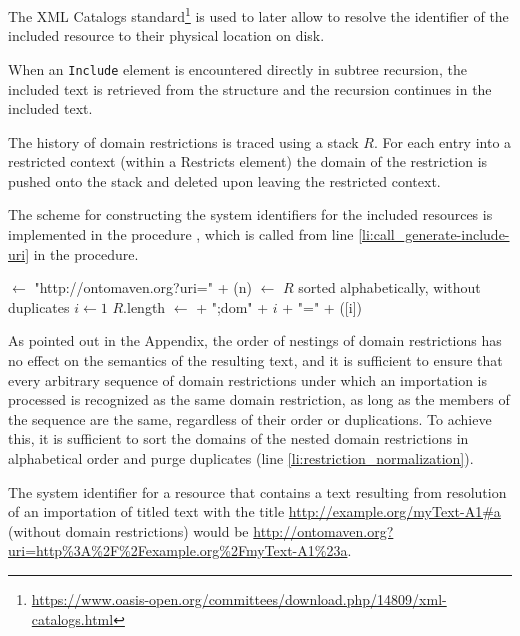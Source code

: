 \documentclass{IOS-Book-Article}
\begin{document}
The XML Catalogs standard\footnote{\url{https://www.oasis-open.org/committees/download.php/14809/xml-catalogs.html}} is used to later allow to resolve the identifier of the included resource to their physical location on disk. 

When an \texttt{Include} element is encountered directly in subtree recursion, the included text is retrieved from the  structure and the recursion continues in the included text.

The history of domain restrictions is traced using a stack $R$. For each entry into a restricted context (within a Restricts element) the domain of the restriction is pushed onto the stack and deleted upon leaving the restricted context.

The scheme for constructing the system identifiers for the included resources is implemented in the procedure , which is called from line \ref{li:call_generate-include-uri} in the  procedure.

\begin{codebox}
\zi {}
\li {} $\gets$ "http://ontomaven.org?uri=" + (n)
\li {} $\gets$ $R$ sorted alphabetically, without duplicates \label{li:restriction_normalization}
\li \For $i \gets 1$ \To $R$.length
\li \Do
\li     {} $\gets$  + ";dom" + $i$ + "=" + ([i])
\End
\li \Return {}
\end{codebox}

As pointed out in the Appendix, the order of nestings of domain restrictions  has no effect on the semantics of the resulting text, and it is sufficient to ensure that every arbitrary sequence of domain restrictions under which an importation is processed is recognized as the same domain restriction, as long as the members of the sequence are the same, regardless of their order or duplications. To achieve this, it is sufficient to sort the domains of the nested domain restrictions in alphabetical order and purge duplicates (line \ref{li:restriction_normalization}).

The system identifier for a resource that contains a text resulting from resolution of an importation of titled text with the title \url{http://example.org/myText-A1#a} (without domain restrictions) would be \url{http://ontomaven.org?uri=http\%3A\%2F\%2Fexample.org\%2FmyText-A1\%23a}.
\end{document}

